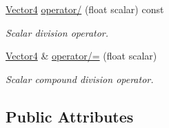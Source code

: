 \begin{DoxyCompactItemize}
\hyperlink{classchaos_1_1gfx_1_1_vector4}{Vector4} \hyperlink{classchaos_1_1gfx_1_1_vector4_accffe88c758a09b13b68ee1692663de9}{operator/} (float scalar) const 
\begin{DoxyCompactList}\small\item\em Scalar division operator. \end{DoxyCompactList}\item 
\hyperlink{classchaos_1_1gfx_1_1_vector4}{Vector4} \& \hyperlink{classchaos_1_1gfx_1_1_vector4_a1ce1c817fbc1999faeb34d08f4df284b}{operator/=} (float scalar)
\begin{DoxyCompactList}\small\item\em Scalar compound division operator. \end{DoxyCompactList}\end{DoxyCompactItemize}
\subsection*{Public Attributes}
